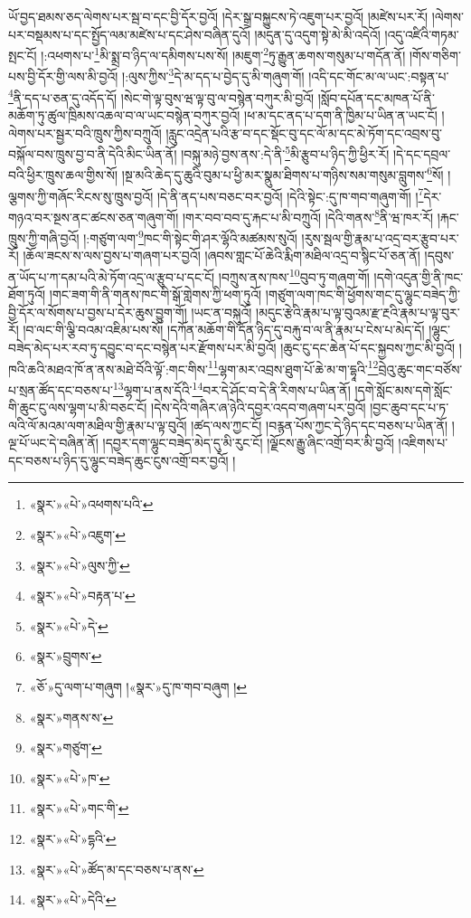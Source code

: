 ཡོ་བྱད་ཐམས་ཅད་ལེགས་པར་སྦ་བ་དང་བྱི་དོར་བྱའོ། །དེར་སྒྲ་བསྐྱུངས་ཏེ་འཇུག་པར་བྱའོ། །མཛེས་པར་རོ། །ལེགས་པར་བསྡམས་པ་དང་སྤྱོད་ལམ་མཛེས་པ་དང་ཤེས་བཞིན་དུའོ། །མདུན་དུ་འདུག་སྟེ་མེ་མི་འདེའོ། །འདུ་འཛིའི་གཏམ་སྤང་ངོ། །:འཕགས་པ་\footnote{«སྣར་»«པེ་»འཕགས་པའི་}མི་སྨྲ་བ་ཉིད་ལ་དམིགས་པས་སོ། །མཇུག་\footnote{«སྣར་»«པེ་»འཇུག་}ཏུ་རྒྱུན་ཆགས་གསུམ་པ་གདོན་ནོ། །གོས་གཅིག་པས་བྱི་དོར་གྱི་ལས་མི་བྱའོ། །:ལུས་ཀྱིས་\footnote{«སྣར་»«པེ་»ལུས་ཀྱི་}དེ་མ་དད་པ་བྱེད་དུ་མི་གཞུག་གོ། །འདི་དང་གོང་མ་ལ་ཡང་:བསྟན་པ་\footnote{«སྣར་»«པེ་»བརྟན་པ་}ནི་དད་པ་ཅན་དུ་འདོད་དོ། །སེང་གེ་ལྟ་བུས་ཝ་ལྟ་བུ་ལ་བསྙེན་བཀུར་མི་བྱའོ། །སློབ་དཔོན་དང་མཁན་པོ་ནི་མཆོག་ཏུ་ཚུལ་ཁྲིམས་འཆལ་བ་ལ་ཡང་བསྙེན་བཀུར་བྱའོ། །ཕ་མ་དང་ནད་པ་དག་ནི་ཁྱིམ་པ་ཡིན་ན་ཡང་ངོ། །ལེགས་པར་སྦྱར་བའི་ཁྲུས་ཀྱིས་བཀྲུའོ། །རླུང་འདྲེན་པའི་རྩ་བ་དང་སྡོང་བུ་དང་ལོ་མ་དང་མེ་ཏོག་དང་འབྲས་བུ་བསྐོལ་བས་ཁྲུས་བྱ་བ་ནི་དེའི་མིང་ཡིན་ནོ། །བསྐུ་མཉེ་བྱས་ནས་:དེ་ནི་\footnote{«སྣར་»«པེ་»དེ་}མི་རྩུབ་པ་ཉིད་ཀྱི་ཕྱིར་རོ། །དེ་དང་དབྲལ་བའི་ཕྱིར་ཁྲུས་ཆལ་གྱིས་སོ། །སྔ་མའི་ཆེད་དུ་ཆུའི་བུམ་པ་ཕྱི་མར་སྣུམ་ཐིགས་པ་གཉིས་སམ་གསུམ་བླུགས་\footnote{«སྣར་»བྲུགས་}སོ། །ལྕགས་ཀྱི་གཞོང་རིངས་སུ་ཁྲུས་བྱའོ། །དེ་ནི་ནད་པས་བཅང་བར་བྱའོ། །དེའི་སྟེང་:དུ་ཁ་གབ་གཞུག་གོ། །\footnote{«ཅོ་»དུ་ལག་པ་གཞུག །«སྣར་»དུ་ཁ་གབ་བཞུག །}དེར་གཉའ་བར་སྔས་ནང་ཚངས་ཅན་གཞུག་གོ། །གར་བབ་བབ་དུ་རྐང་པ་མི་བཀྲུའོ། །དེའི་གནས་\footnote{«སྣར་»གནས་ས་}ནི་ཝ་ཁར་རོ། །རྐང་ཁྲུས་ཀྱི་གཞི་བྱའོ། །:གཙུག་ལག་\footnote{«སྣར་»གཙུག་}ཁང་གི་སྟེང་གི་ཤར་ལྷོའི་མཚམས་སུའོ། །རུས་སྦལ་གྱི་རྣམ་པ་འདྲ་བར་རྩུབ་པར་རོ། །ཆོལ་ཟངས་ས་ལས་བྱས་པ་གཞག་པར་བྱའོ། །ཞབས་གླང་པོ་ཆེའི་རྨིག་མཐིལ་འདྲ་བ་སྙིང་པོ་ཅན་ནོ། །དབུས་ན་ཡོད་པ་ཀ་དམ་པའི་མེ་ཏོག་འདྲ་ལ་རྩུབ་པ་དང་ངོ། །བཀྲུས་ནས་ཁས་\footnote{«སྣར་»«པེ་»ཁ་}བུབ་ཏུ་གཞག་གོ། །དགེ་འདུན་གྱི་ནི་ཁང་ཐོག་ཏུའོ། །གང་ཟག་གི་ནི་གནས་ཁང་གི་སྒོ་གླེགས་ཀྱི་ཕག་ཏུའོ། །གཙུག་ལག་ཁང་གི་ཕྱོགས་གང་དུ་ལྷུང་བཟེད་ཀྱི་བྱི་དོར་ལ་སོགས་པ་བྱས་པ་དེར་ཆུས་བྱུག་གོ། །ཡང་ན་བསྐུའོ། །མདུང་རྩེའི་རྣམ་པ་ལྟ་བུའམ་རྫ་རྔའི་རྣམ་པ་ལྟ་བུར་རོ། །བ་ལང་གི་ལྕི་བའམ་འཇིམ་པས་སོ། །དཀོན་མཆོག་གི་དོན་ཉིད་དུ་བརྐུ་བ་ལ་ནི་རྣམ་པ་ངེས་པ་མེད་དོ། །ལྷུང་བཟེད་མེད་པར་རབ་ཏུ་དབྱུང་བ་དང་བསྙེན་པར་རྫོགས་པར་མི་བྱའོ། །ཆུང་ངུ་དང་ཆེན་པོ་དང་སྐྱབས་ཀྱང་མི་བྱའོ། །ཁའི་ཆའི་མཐའ་ཁོ་ན་ནས་མཐེ་བོའི་ལྟོ་:གང་གིས་\footnote{«སྣར་»«པེ་»གང་གི་}ལྷག་མར་འབྲས་ཐུག་པོ་ཆེ་མ་ག་དྷཱའི་\footnote{«སྣར་»«པེ་»དྷའི་}བྲེའུ་ཆུང་གང་བཙོས་པ་སྲན་ཚོད་དང་བཅས་པ་\footnote{«སྣར་»«པེ་»ཚོད་མ་དང་བཅས་པ་ནས་}ལྷག་པ་ནས་དོའི་\footnote{«སྣར་»«པེ་»དེའི་}བར་དེ་ཤོང་བ་དེ་ནི་རིགས་པ་ཡིན་ནོ། །དགེ་སློང་མས་དགེ་སློང་གི་ཆུང་ངུ་ལས་ལྷག་པ་མི་བཅང་ངོ། །དེས་དེའི་གཞིར་ཞ་ཉེའི་དབྱར་འདབ་གཞག་པར་བྱའོ། །བྱང་ཆུབ་དང་པ་ཏ་ལའི་ལོ་མའམ་ལག་མཐིལ་གྱི་རྣམ་པ་ལྟ་བུའོ། །ཚད་ལས་ཀྱང་ངོ། །བརྙན་པོས་ཀྱང་དེ་ཉིད་དང་བཅས་པ་ཡིན་ནོ། །ལྔ་པོ་ཡང་དེ་བཞིན་ནོ། །དབྱར་དག་ལྷུང་བཟེད་མེད་དུ་མི་རུང་ངོ། །ལྗོངས་རྒྱུ་ཞིང་འགྲོ་བར་མི་བྱའོ། །འཇིགས་པ་དང་བཅས་པ་ཉིད་དུ་ལྷུང་བཟེད་ཆུང་ངུས་འགྲོ་བར་བྱའོ། །

